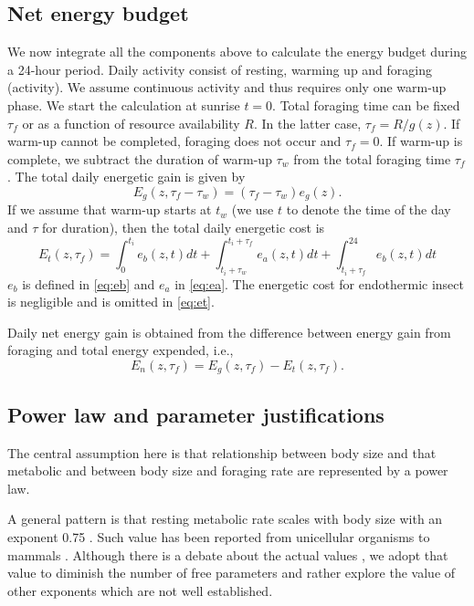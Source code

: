  \subsection*{Net energy budget}
We now integrate all the components above to calculate  the energy budget during a 24-hour period.
Daily activity consist of resting, warming up and foraging (activity).
We assume continuous activity and thus requires only one warm-up phase.
We start the calculation at sunrise $t = 0$.
Total foraging time can be fixed $\tau_f$ or as a function of resource availability $R$. 
In the latter case, $\tau_f = R/g(z)$.
If warm-up cannot be completed, foraging does not occur and $\tau_f = 0$.
If warm-up is complete, we subtract the duration of warm-up $\tau_w$ from the total foraging time $\tau_f$. 
The total daily energetic gain is given by
\[
	E_g(z,\tau_f - \tau_w) = (\tau_f - \tau_w) e_g(z).
\]
%
If we assume that warm-up starts at $t_w$ (we use $t$ to denote the time of the day and $\tau$ for duration), then the total daily  energetic cost is
\begin{equation} \label{eq:et}
	E_t(z, \tau_f) = \int_0^{t_i} e_b(z, t) dt + \int_{t_i + \tau_w}^{t_i + \tau_f } e_a(z,t) dt + \int_{t_i+\tau_f}^{24} e_b(z, t) dt 
\end{equation}
$e_b$ is defined in \cref{eq:eb}  and $e_a$ in \cref{eq:ea}.
The energetic cost for endothermic insect is negligible \citep{Heinrich1975} and is omitted in \cref{eq:et}. %

Daily net energy gain is obtained from the  difference between energy gain from foraging and total energy expended, i.e.,
\[ 
	E_n(z, \tau_f) = E_g(z,\tau_f) - E_t(z, \tau_f).
\]

\subsection*{Power law and parameter justifications}
The central assumption here is that relationship between body size and that metabolic and between body size and foraging rate are represented by a power law.

A general pattern is that resting metabolic rate scales with body size with an exponent 0.75 \citep{Kleiber1947, Peters1986, Brown2004}.
Such value has been reported from unicellular organisms to mammals \citep{Brown2004}.
Although there is a debate about the actual values \citep[e.g.,][]{Isaac2010}, we adopt that value to diminish the number of free parameters and rather explore the value of other exponents which are not well established.

